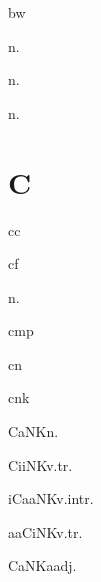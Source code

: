 \begin{multicols*}{2}
\begin{dictroot}{bw}{\bigglot}
    \begin{dictentry}{}{n.}
    \end{dictentry}
    \begin{dictentry}{}{n.}
    \end{dictentry}
    \begin{dictentry}{}{n.}
    \end{dictentry}
\end{dictroot}

\section*{C}

\begin{dictroot}{c}{c}
\end{dictroot}

\begin{dictroot}{c}{f}
    \begin{dictentry}{}{n.}
    \end{dictentry}
\end{dictroot}

\begin{dictroot}{c}{mp}
\end{dictroot}

\begin{dictroot}{c}{n}
\end{dictroot}

\begin{dictroot}{c}{nk}
    \begin{dictentry}{CaNK}{n.}
    \end{dictentry}
    \begin{dictentry}{CiiNK}{v.tr.}
        \dictdef{
        }
        \dictdef{
        }
    \end{dictentry}
    \begin{dictentry}{iCaaNK}{v.intr.}
    \end{dictentry}
    \begin{dictentry}{aaCiNK}{v.tr.}
    \end{dictentry}
    \begin{dictentry}{CaNKa}{adj.}
    \end{dictentry}
\end{dictroot}


\end{multicols*}
